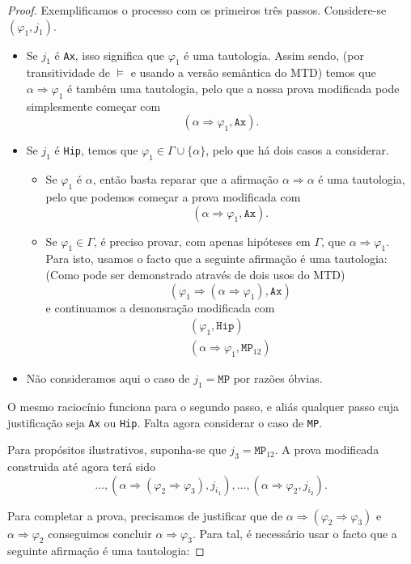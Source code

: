 \documentclass{report}
\theoremstyle{definition}
\theoremstyle{remark}
\newcommand{\imply}{\mathbin{\Rightarrow}}
\begin{document}
\begin{proof}
	Exemplificamos o processo com os primeiros três passos. Considere-se $(\varphi_1, j_1)$.
	
	\begin{itemize}
	\item Se $j_1$ é \texttt{Ax}, isso significa que $\varphi_1$ é uma tautologia. Assim sendo, (por transitividade de $\vDash$ e usando a versão semântica do MTD) temos que $\alpha \imply \varphi_1$ é também uma tautologia, pelo que a nossa prova modificada pode simplesmente começar com
	\[(\alpha \imply \varphi_1, \texttt{Ax}).\]
	
	\item Se $j_1$ é \texttt{Hip}, temos que $\varphi_1 \in \Gamma \cup \{\alpha\}$, pelo que há dois casos a considerar.
	\begin{itemize}
	\item Se $\varphi_1$ é $\alpha$, então basta reparar que a afirmação $\alpha \imply \alpha$ é uma tautologia, pelo que podemos começar a prova modificada com
	\[(\alpha \imply \varphi_1, \texttt{Ax}).\]
	
	\item Se $\varphi_1 \in \Gamma$, é preciso provar, com apenas hipóteses em $\Gamma$, que $\alpha \imply \varphi_1$. Para isto, usamos o facto que a seguinte afirmação é uma tautologia: (Como pode ser demonstrado através de dois usos do MTD)
	\[(\varphi_1 \imply (\alpha \imply \varphi_1), \texttt{Ax})\]
	e continuamos a demonsração modificada com
	\begin{gather*}
	(\varphi_1, \texttt{Hip})\\
	(\alpha \imply \varphi_1, \texttt{MP}_{12})
	\end{gather*}
	\end{itemize}
	
	\item Não consideramos aqui o caso de $j_1 = \texttt{MP}$ por razões óbvias.
	\end{itemize}
	
	O mesmo raciocínio funciona para o segundo passo, e aliás qualquer passo cuja justificação seja \texttt{Ax} ou \texttt{Hip}. Falta agora considerar o caso de \texttt{MP}.
	
	Para propósitos ilustrativos, suponha-se que $j_3 = \texttt{MP}_{12}$. A prova modificada construida até agora terá sido
	\[\dots, (\alpha \imply (\varphi_2 \imply \varphi_3), j_{i_1}), \dots, (\alpha \imply \varphi_2, j_{i_2}).\]
	
	Para completar a prova, precisamos de justificar que de $\alpha \imply (\varphi_2 \imply \varphi_3)$ e $\alpha \imply \varphi_2$ conseguimos concluir $\alpha \imply \varphi_3$.  Para tal, é necessário usar o facto que a seguinte afirmação é uma tautologia:
	

\end{proof}
\end{document}
